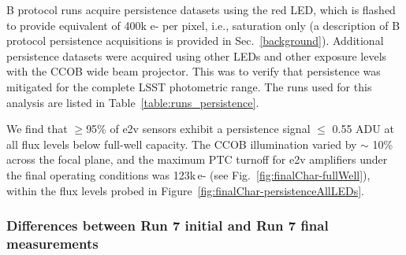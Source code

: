 B protocol runs acquire persistence datasets using the red LED, which is flashed to provide equivalent of 400k e- per pixel, i.e., saturation only (a description of B protocol persistence acquisitions is provided in Sec.~\ref{background}). Additional persistence datasets were acquired using other LEDs and other exposure levels with the CCOB wide beam projector. This was to verify that persistence was mitigated for the complete LSST photometric range. The runs used for this analysis are listed in Table~\ref{table:runs_persistence}.

We find that $\geq$95\% of e2v sensors exhibit a persistence signal $\leq$ 0.55 ADU at all flux levels below full-well capacity. The CCOB illumination varied by $\sim$ 10\% across the focal plane, and the maximum PTC turnoff for e2v amplifiers under the final operating conditions was 123k\,e- (see Fig.~\ref{fig:finalChar-fullWell}), within the flux levels probed in Figure~\ref{fig:finalChar-persistenceAllLEDs}.

\subsubsection{Differences between Run 7 initial and Run 7 final measurements}\label{final-differences-from-previous-runs}

